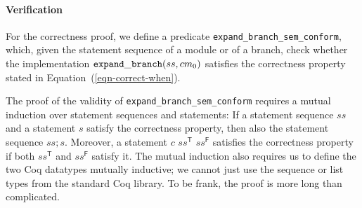 

\paragraph*{Verification}
%
%
%


For the correctness proof, we define a predicate {\tt expand\_branch\_sem\_conform}, which, 
given the statement sequence of a module or of a  branch,
check whether the implementation ${\tt expand\_branch}(ss, cm_0)$ satisfies the correctness property stated in Equation~(\ref{eqn-correct-when}). 

The proof of the validity of {\tt expand\_branch\_sem\_conform} requires a mutual induction over statement sequences and statements:
If a statement sequence $ss$ and a statement $s$ satisfy the correctness property, then also the statement sequence $ss ; s$.
Moreover, a statement  $c$ \prettyll{:} $ss^\mathsf{T}$  $ss^\mathsf{F}$
satisfies the correctness property if both $ss^\mathsf{T}$ and $ss^\mathsf{F}$ satisfy it. 
The mutual induction also requires us to define the two Coq datatypes mutually inductive;
we cannot just use the sequence or list types from the standard Coq library. To be frank, the proof is more long than complicated. 

